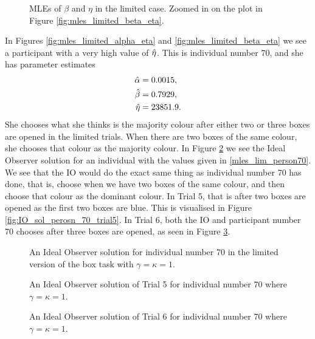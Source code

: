 \begin{figure}
\begin{minipage}{0.48\textwidth}
        \caption[MLEs of $\beta$ and $\eta$ zoomed, limited. $\gamma=\kappa=1$]{MLEs of $\beta$ and $\eta$ in the limited case. Zoomed in on the plot in Figure \ref{fig:mles_limited_beta_eta}.}
        \label{fig:mles_limited_beta_eta_zoomed}
    \end{minipage}
\end{figure}


In Figures \ref{fig:mles_limited_alpha_eta} and \ref{fig:mles_limited_beta_eta} we see a participant with a very high value of $\hat{\eta}$. This is individual number 70, and she has  parameter estimates
\begin{equation}
\label{mles_lim_person70}
    \begin{aligned}
        \hat{\alpha} &= 0.0015,\\
        \hat{\beta} &= 0.7929,\\
        \hat{\eta} &= 23851.9.
    \end{aligned}
\end{equation}
She chooses what she thinks is the majority colour after either two or three boxes are opened in the limited trials. When there are two boxes of the same colour, she chooses that colour as the majority colour. In Figure \ref{fig:IO_sol_person_70} we see the Ideal Observer solution for an individual with the values given in \eqref{mles_lim_person70}. We see that the IO would do the exact same thing as individual number 70 has done, that is, choose when we have two boxes of the same colour, and then choose that colour as the dominant colour. In Trial 5, that is after two boxes are opened as the first two boxes are blue. This is visualised in Figure \ref{fig:IO_sol_perosn_70_trial5}. In Trial 6, both the IO and participant number 70 chooses after three boxes are opened, as seen in Figure \ref{fig:IO_sol_person70_trial6}.
\begin{figure}
    \centering
    \scalebox{0.7}{}
    \caption[Ideal Observer solution individual 70, limited. $\gamma=\kappa=1$]{An Ideal Observer solution for individual number 70 in the limited version of the box task with $\gamma=\kappa=1$.}
    \label{fig:IO_sol_person_70}
\end{figure}

\begin{figure}
    \centering
    \begin{minipage}{0.48\textwidth}
        \centering
        \scalebox{0.7}{}
        \caption[Ideal Observer solution individual 70 in trial 5. $\gamma=\kappa=1$]{An Ideal Observer solution of Trial 5 for individual number 70 where $\gamma=\kappa=1$.}
        \label{fig:IO_sol_perosn_70_trial5}
    \end{minipage}
    \hfill
    \begin{minipage}{0.48\textwidth}
        \centering
        \scalebox{0.7}{}
        \caption[Ideal Observer solution individual 70 in trial 6. $\gamma=\kappa=1$]{An Ideal Observer solution of Trial 6 for individual number 70 where $\gamma=\kappa=1$.}
        \label{fig:IO_sol_person70_trial6}
    \end{minipage}
\end{figure}

